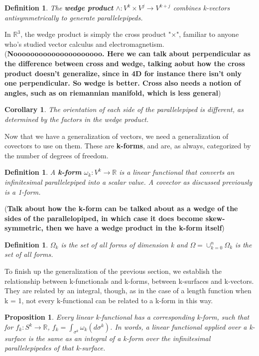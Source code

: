 \documentclass{book}
\newtheorem{defn}[equation]{Definition}
\newtheorem{coro}[equation]{Corollary}
\newtheorem{prop}[equation]{Proposition}
\begin{document}
\begin{defn}
	
	The \textbf{wedge product} $\wedge : V^k\times V^j \to V^{k+j}$ combines k-vectors antisymmetrically to generate parallelepipeds. 
\end{defn}

In $\mathbb{R}^3$, the wedge product is simply the cross product "$\times$", familiar to anyone who's studied vector calculus and electromagnetism. (\textbf{Nooooooooooooooooooooo. Here we can talk about perpendicular as the difference between cross and wedge, talking aobut how the cross product doesn't generalize, since in 4D for instance there isn't only one perpendicular. So wedge is better. Cross also needs a notion of angles, such as on riemannian manifold, which is less general})

\begin{coro}
	The orientation of each side of the parallelepiped is different, as determined by the factors in the wedge product. 
\end{coro}

Now that we have a generalization of vectors, we need a generalization of covectors to use on them. These are \textbf{k-forms}, and are, as always, categorized by the number of degrees of freedom. 

\begin{defn}
	A \textbf{k-form} $\omega_k : V^k \to \mathbb{R}$ is a linear functional that converts an infinitesimal parallelepiped into a scalar value. A covector as discussed previously is a 1-form. 
\end{defn}

(\textbf{Talk about how the k-form can be talked about as a wedge of the sides of the parallelopiped, in which case it does become skew-symmetric, then we have a wedge product in the k-form itself})

\begin{defn}
	$\Omega_k$ is the set of all forms of dimension k and $\Omega = \cup_{k=0}^n\Omega_k$ is the set of all forms. 
\end{defn}

To finish up the generalization of the previous section, we establish the relationship between k-functionals and k-forms, between k-surfaces and k-vectors. They are related by an integral, though, as in the case of a length function when k = 1, not every k-functional can be related to a k-form in this way. 

\begin{prop}
	Every linear k-functional has a corresponding k-form, such that for $f_k : S^k \to \mathbb{R}$, $f_k = \int_{\sigma^k} \omega_k(d\sigma^k)$. In words, a linear functional applied over a k-surface is the same as an integral of a k-form over the infinitesimal parallelepipedes of that k-surface. 
\end{prop}
\end{document}
